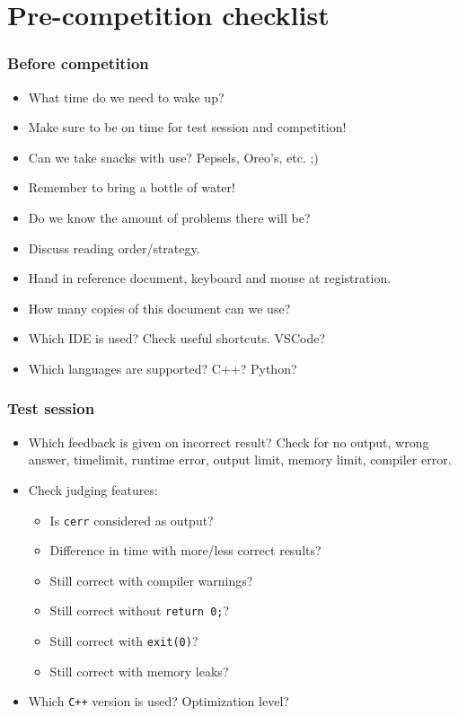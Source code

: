 \section{Pre-competition checklist}

\subsubsection{Before competition}
\begin{itemize}
    \item What time do we need to wake up?
    \item Make sure to be on time for test session and competition!
    \item Can we take snacks with use? Pepsels, Oreo's, etc. ;)
    \item Remember to bring a bottle of water!
    \item Do we know the amount of problems there will be?
    \item Discuss reading order/strategy.
    \item Hand in reference document, keyboard and mouse at registration.
    \item How many copies of this document can we use?
    \item Which IDE is used? Check useful shortcuts. VSCode?
    \item Which languages are supported? C++? Python?
\end{itemize}

\subsubsection{Test session}
\begin{itemize}
    \item Which feedback is given on incorrect result? Check for \textsf{no output}, \textsf{wrong answer}, \textsf{timelimit}, \textsf{runtime error}, \textsf{output limit}, \textsf{memory limit}, \textsf{compiler error}.
    \item Check judging features:
    \begin{itemize}
        \item Is \texttt{cerr} considered as output?
        \item Difference in time with more/less correct results?
        \item Still correct with compiler warnings?
        \item Still correct without \texttt{return 0;}?
        \item Still correct with \texttt{exit(0)}?
        \item Still correct with memory leaks?
    \end{itemize}
    \item Which \texttt{C++} version is used? Optimization level?
\end{itemize}

